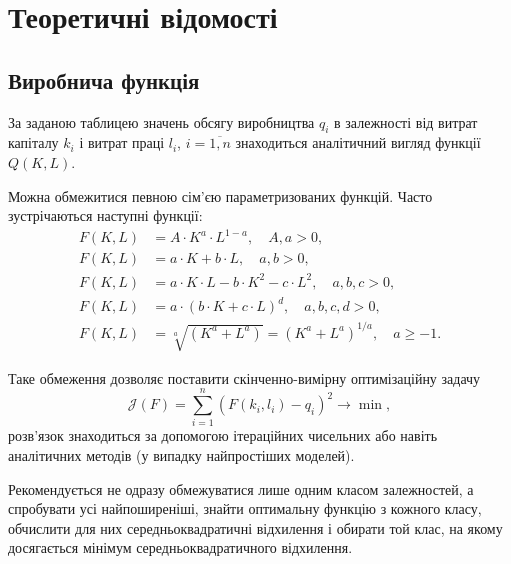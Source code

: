 




\tableofcontents

\section{Теоретичні відомості}

\subsection{Виробнича функція}

За заданою таблицею значень обсягу виробництва $q_i$ в залежності від витрат капіталу $k_i$ і витрат праці $l_i$, $i = \overline{1, n}$ знаходиться аналітичний вигляд функції $Q(K, L)$. \medskip

Можна обмежитися певною сім'єю параметризованих функцій. Часто зустрічаються наступні функції:
\begin{align*}
	F(K, L) &= A \cdot K^a \cdot L^{1 - a}, \quad A, a > 0, \\
	F(K, L) &= a \cdot K + b \cdot L, \quad a, b > 0, \\
	F(K, L) &= a \cdot K \cdot L - b \cdot K^2 - c \cdot L^2, \quad a, b, c > 0, \\
	F(K, L) &= a \cdot (b \cdot K + c \cdot L)^d, \quad a, b, c, d > 0, \\
	F(K, L) &= \sqrt[a]{(K^a + L^a)} = (K^a + L^a)^{1 / a}, \quad a \ge -1.
\end{align*}

Таке обмеження дозволяє поставити скінченно-вимірну оптимізаційну задачу \[ \mathcal{J}(F) = \sum_{i = 1}^n \left( F(k_i, l_i) - q_i \right)^2 \to \min, \] розв'язок знаходиться за допомогою ітераційних чисельних або навіть аналітичних методів (у випадку найпростіших моделей). \medskip

Рекомендується не одразу обмежуватися лише одним класом залежностей, а спробувати усі найпоширеніші, знайти оптимальну функцію з кожного класу, обчислити для них середньоквадратичні відхилення і обирати той клас, на якому досягається мінімум середньоквадратичного відхилення.

